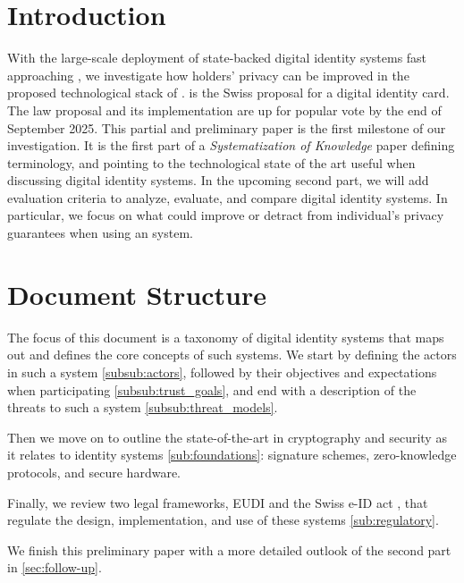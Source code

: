 \section{Introduction}

With the large-scale deployment of state-backed digital identity systems fast approaching \cite{Swiyu} \cite{EUDI-ARF}, we investigate how holders' privacy can be improved in the proposed technological stack of \swiyu.
\swiyu is the Swiss proposal for a digital identity card.
The law proposal and its implementation are up for popular vote by the end of September 2025.
This partial and preliminary paper is the first milestone of our investigation. 
It is the first part of a \emph{Systematization of Knowledge} paper defining terminology, and pointing to the technological state of the art useful when discussing digital identity systems.
In the upcoming second part, we will add evaluation criteria to analyze, evaluate, and compare digital identity systems.
In particular, we focus on what could improve or detract from individual's privacy guarantees when using an \eid system.

\section{Document Structure}

The focus of this document is a taxonomy of digital identity systems that maps out and defines the core concepts of such systems.
We start by defining the actors in such a system \ref{subsub:actors}, followed by their objectives and expectations when participating \ref{subsub:trust_goals}, and end with a description of the threats to such a system \ref{subsub:threat_models}.

Then we move on to outline the state-of-the-art in cryptography and security as it relates to identity systems \ref{sub:foundations}: signature schemes, zero-knowledge protocols, and secure hardware.

Finally, we review two legal frameworks, EUDI \cite{EUDI} and the Swiss e-ID act \cite{SwiyuAct25}, that regulate the design, implementation, and use of these systems \ref{sub:regulatory}.

We finish this preliminary paper with a more detailed outlook of the second part in \ref{sec:follow-up}.